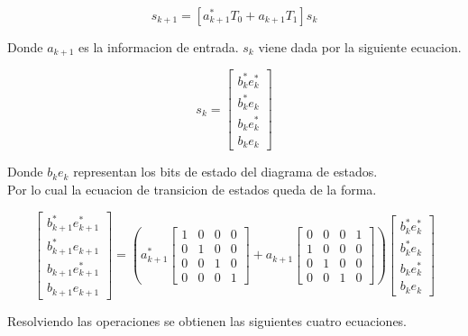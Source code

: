 \begin{equation*}
    s_{k+1}=[a_{k+1}^*T_0+a_{k+1}T_1]s_k
\end{equation*}

Donde $a_{k+1}$ es la informacion de entrada. $s_k$ viene dada por la siguiente ecuacion.

\begin{equation*}
    s_k = 
    \begin{bmatrix}
        b_k^*e_k^* \\
        b_k^*e_k   \\
        b_ke_k^*   \\
        b_ke_k
    \end{bmatrix}
\end{equation*}

Donde $b_k e_k$ representan los bits de estado del diagrama de estados.\\
Por lo cual la ecuacion de transicion de estados queda de la forma.

\begin{equation*}
    \begin{bmatrix}
        b_{k+1}^*e_{k+1}^* \\
        b_{k+1}^*e_{k+1}   \\
        b_{k+1}e_{k+1}^*   \\
        b_{k+1}e_{k+1}
    \end{bmatrix}
    =
    \left(
    a_{k+1}^*
    \begin{bmatrix}
        1 & 0 & 0 & 0\\
        0 & 1 & 0 & 0\\
        0 & 0 & 1 & 0\\
        0 & 0 & 0 & 1
    \end{bmatrix}
    +
    a_{k+1}
    \begin{bmatrix}
        0 & 0 & 0 & 1\\
        1 & 0 & 0 & 0\\
        0 & 1 & 0 & 0\\
        0 & 0 & 1 & 0
    \end{bmatrix}
    \right)
    \begin{bmatrix}
        b_k^*e_k^* \\
        b_k^*e_k   \\
        b_ke_k^*   \\
        b_ke_k
    \end{bmatrix}
\end{equation*}

Resolviendo las operaciones se obtienen las siguientes cuatro ecuaciones.

